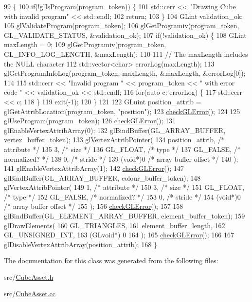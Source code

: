 \begin{DoxyCode}
99                                          \{
100   \textcolor{keywordflow}{if}(!glIsProgram(program\_token)) \{
101     std::cerr << \textcolor{stringliteral}{"Drawing Cube with invalid program"} << std::endl;
102     \textcolor{keywordflow}{return};
103   \}
104   GLint validation\_ok;
105   glValidateProgram(program\_token);
106   glGetProgramiv(program\_token, GL\_VALIDATE\_STATUS, &validation\_ok);
107   \textcolor{keywordflow}{if}(!validation\_ok) \{
108     GLint maxLength = 0;
109     glGetProgramiv(program\_token, GL\_INFO\_LOG\_LENGTH, &maxLength);
110 
111     \textcolor{comment}{// The maxLength includes the NULL character}
112     std::vector<char> errorLog(maxLength);
113     glGetProgramInfoLog(program\_token, maxLength, &maxLength, &errorLog[0]);
114 
115     std::cerr << \textcolor{stringliteral}{"Invalid program "} << program\_token << \textcolor{stringliteral}{" with error code "} << validation\_ok << std::endl;
116     \textcolor{keywordflow}{for}(\textcolor{keyword}{auto} c: errorLog) \{
117       std::cerr << c;
118     \}
119     exit(-1);
120   \}
121 
122   GLuint position\_attrib = glGetAttribLocation(program\_token, \textcolor{stringliteral}{"position"});
123   \hyperlink{CubeAsset_8cc_a75f201b0e53e68726854997957322b8d}{checkGLError}();
124 
125   glUseProgram(program\_token);
126   \hyperlink{CubeAsset_8cc_a75f201b0e53e68726854997957322b8d}{checkGLError}();
131   glEnableVertexAttribArray(0);
132   glBindBuffer(GL\_ARRAY\_BUFFER, vertex\_buffer\_token);
133   glVertexAttribPointer(
134     position\_attrib,        \textcolor{comment}{/* attribute */}
135     3,        \textcolor{comment}{/* size */}
136     GL\_FLOAT,   \textcolor{comment}{/* type */}
137     GL\_FALSE,   \textcolor{comment}{/* normalized? */}
138     0,        \textcolor{comment}{/* stride */}
139     (\textcolor{keywordtype}{void}*)0    \textcolor{comment}{/* array buffer offset */}
140   );
141   glEnableVertexAttribArray(1);
142   \hyperlink{CubeAsset_8cc_a75f201b0e53e68726854997957322b8d}{checkGLError}();
147   glBindBuffer(GL\_ARRAY\_BUFFER, colour\_buffer\_token);
148   glVertexAttribPointer(
149     1,        \textcolor{comment}{/* attribute */}
150     3,        \textcolor{comment}{/* size */}
151     GL\_FLOAT,   \textcolor{comment}{/* type */}
152     GL\_FALSE,   \textcolor{comment}{/* normalized? */}
153     0,        \textcolor{comment}{/* stride */}
154     (\textcolor{keywordtype}{void}*)0    \textcolor{comment}{/* array buffer offset */}
155   );
156   \hyperlink{CubeAsset_8cc_a75f201b0e53e68726854997957322b8d}{checkGLError}();
157 
158   glBindBuffer(GL\_ELEMENT\_ARRAY\_BUFFER, element\_buffer\_token);
159   glDrawElements(
160     GL\_TRIANGLES,
161     element\_buffer\_length,
162     GL\_UNSIGNED\_INT,
163     (GLvoid*) 0
164   );
165   \hyperlink{CubeAsset_8cc_a75f201b0e53e68726854997957322b8d}{checkGLError}();
166 
167   glDisableVertexAttribArray(position\_attrib);
168 \}
\end{DoxyCode}


The documentation for this class was generated from the following files\+:\begin{DoxyCompactItemize}
\item 
src/\hyperlink{CubeAsset_8h}{Cube\+Asset.\+h}\item 
src/\hyperlink{CubeAsset_8cc}{Cube\+Asset.\+cc}\end{DoxyCompactItemize}
